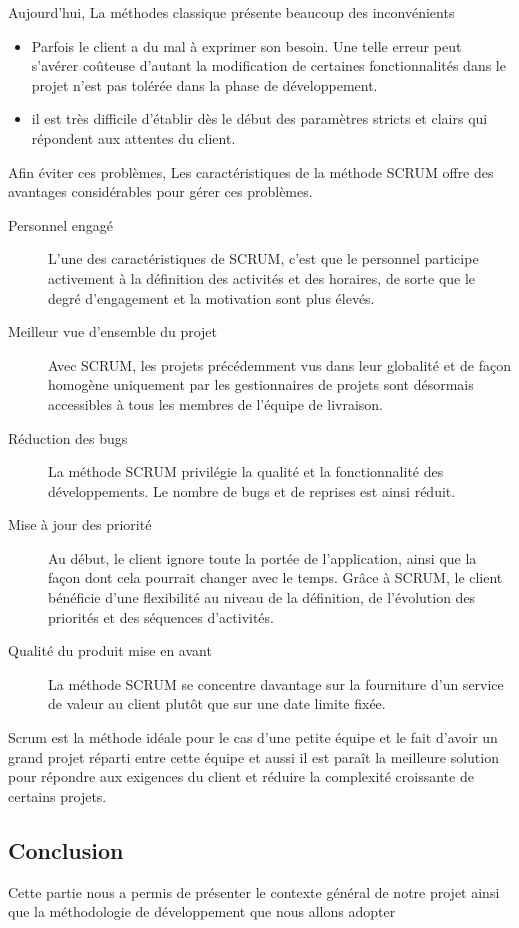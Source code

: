 Aujourd'hui, La méthodes classique présente beaucoup des inconvénients 
\begin{itemize}
 \item Parfois le client a
du mal à exprimer son besoin. Une telle erreur peut s'avérer 
coûteuse d'autant la modification
de certaines fonctionnalités dans le projet n'est pas
tolérée dans la phase de développement.
 \item il est très difficile d'établir dès
le début des paramètres stricts et clairs qui répondent aux attentes du client.
\end{itemize}
Afin éviter ces problèmes, Les caractéristiques de la méthode SCRUM offre
des avantages considérables pour gérer ces problèmes.
\begin{description}
 \item [Personnel engagé] L'une des caractéristiques de SCRUM, 
 c'est que le personnel participe activement à la définition des activités et
 des horaires, de sorte que le degré d'engagement et la motivation sont plus élevés.
 \item [Meilleur vue d'ensemble du projet] Avec SCRUM, les projets 
 précédemment vus dans leur globalité et de façon homogène uniquement par
 les gestionnaires de projets sont désormais accessibles à tous les membres de
 l'équipe de livraison.
 \item [Réduction des bugs] La méthode SCRUM privilégie la qualité et la
 fonctionnalité des développements. Le nombre de bugs et
 de reprises est ainsi réduit.
 \item [Mise à jour des priorité] Au début, le client ignore toute 
 la portée de l'application, ainsi que la façon dont cela pourrait changer avec 
 le temps. Grâce à SCRUM, le client bénéficie d'une flexibilité 
 au niveau de la définition, de l'évolution des priorités et des séquences d'activités.
 \item [Qualité du produit mise en avant] La méthode SCRUM se concentre davantage 
 sur la fourniture d'un service de valeur au client plutôt que sur 
 une date limite fixée.
\end{description}

Scrum est la méthode idéale pour le cas d'une petite équipe et le fait d'avoir un grand 
projet réparti entre cette équipe et aussi il est paraît la meilleure solution pour 
répondre aux exigences du client et réduire la complexité croissante de 
certains projets.

\subsection{Conclusion}

Cette partie nous a permis de présenter le contexte général de notre projet ainsi que la
méthodologie de développement que nous allons adopter
